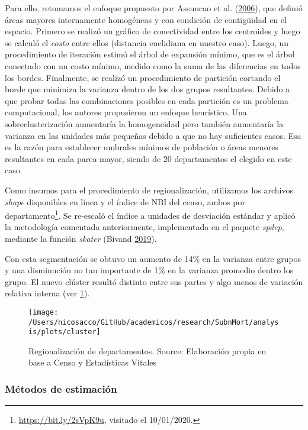 \documentclass[12pt,]{article}
\begin{document}
Para ello, retomamos el enfoque propuesto por Assuncao et al.
(\protect\hyperlink{ref-AssunCao2006}{2006}), que definió áreas mayores
internamente homogéneas y con condición de contigüidad en el espacio.
Primero se realizó un gráfico de conectividad entre los centroides y
luego se calculó el \emph{costo} entre ellos (distancia euclidiana en
nuestro caso). Luego, un procedimiento de iteración estimó el árbol de
expansión mínimo, que es el árbol conectado con un costo mínimo, medido
como la suma de las diferencias en todos los bordes. Finalmente, se
realizó un procedimiento de partición cortando el borde que minimiza la
varianza dentro de los dos grupos resultantes. Debido a que probar todas
las combinaciones posibles en cada partición es un problema
computacional, los autores propusieron un enfoque heurístico. Una
sobreclusterización aumentaría la homogeneidad pero también aumentaría
la varianza en las unidades más pequeñas debido a que no hay suficientes
casos. Esa es la razón para establecer umbrales mínimos de población o
áreas menores resultantes en cada parea mayor, siendo de 20
departamentos el elegido en este caso.

Como insumos para el procedimiento de regionalización, utilizamos los
archivos \emph{shape} disponibles en línea y el índice de NBI del censo,
ambos por departamento\footnote{\url{https://bit.ly/2sVpK9u}, visitado
  el 10/01/2020.}. Se re-escaló el índice a unidades de desviación
estándar y aplicó la metodología comentada anteriormente, implementada
en el paquete \emph{spdep}, mediante la función \emph{skater} (Bivand
\protect\hyperlink{ref-Bivand2019}{2019}).

Con esta segmentación se obtuvo un aumento de 14\% en la varianza entre
grupos y una disminución no tan importante de 1\% en la varianza
promedio dentro los grupo. El nuevo clúster resultó distinto entre sus
partes y algo menos de variación relativa interna (ver
\ref{fig:cluster}).

\begin{figure}

{\centering \texttt{[image: /Users/nicosacco/GitHub/academicos/research/SubnMort/analysis/plots/cluster]} 

}

\caption{Regionalización de departamentos. Source: Elaboración propia en base a Censo y Estadísticas Vitales}\label{fig:cluster}
\end{figure}

\hypertarget{muxe9todos-de-estimaciuxf3n}{%
\subsubsection{Métodos de
estimación}\label{muxe9todos-de-estimaciuxf3n}}
\end{document}
